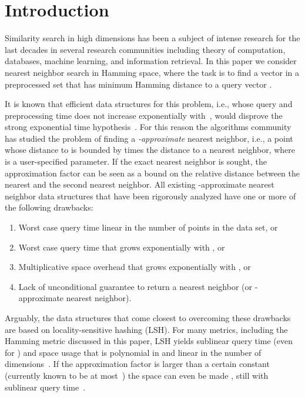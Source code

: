 \documentclass[prodmode,acmtalg]{acmsmall}
\begin{document}
\maketitle


\section{Introduction}

Similarity search in high dimensions has been a subject of intense research for the last decades in several research communities including theory of computation, databases, machine learning, and information retrieval.
In this paper we consider nearest neighbor search in Hamming space, where the task is to find a vector in a preprocessed set  that has minimum Hamming distance to a query vector .

It is known that efficient data structures for this problem, i.e., whose query and preprocessing time does not increase exponentially with~, would disprove the strong exponential time hypothesis~\cite{williams2005new,DBLP:conf/focs/AlmanW15}.
For this reason the algorithms community has studied the problem of finding a \emph{-approximate} nearest neighbor, i.e., a point whose distance to  is bounded by  times the distance to a nearest neighbor, where  is a user-specified parameter.
If the exact nearest neighbor is sought, the approximation factor  can be seen as a bound on the relative distance between the nearest and the second nearest neighbor.
All existing -approximate nearest neighbor data structures that have been rigorously analyzed have one or more of the following drawbacks:
\begin{enumerate}
	\item Worst case query time linear in the number of points in the data set, or
	\item Worst case query time that grows exponentially with , or
	\item Multiplicative space overhead that grows exponentially with , or
	\item Lack of unconditional guarantee to return a nearest neighbor (or -approximate nearest neighbor).
\end{enumerate}
Arguably, the data structures that come closest to overcoming these drawbacks are based on locality-sensitive hashing (LSH).
For many metrics, including the Hamming metric discussed in this paper, LSH yields sublinear query time (even for ) and space usage that is polynomial in  and linear in the number of dimensions~\cite{Indyk1998,gionis1999similarity}.
If the approximation factor  is larger than a certain constant (currently known to be at most~) the space can even be made , still with sublinear query time~\cite{panigrahy2006entropy,kapralov2015smooth,DBLP:journals/corr/Laarhoven15a}.
\end{document}
